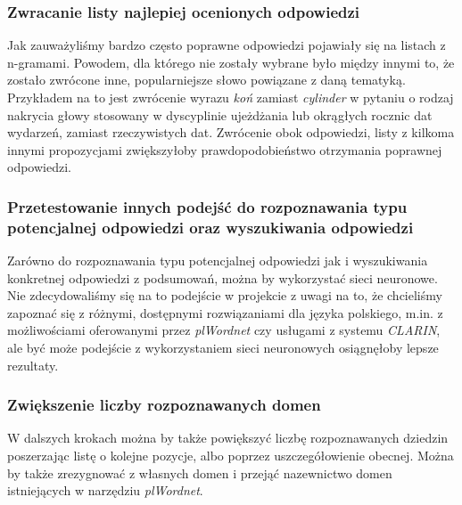 \subsubsection{Zwracanie listy najlepiej ocenionych odpowiedzi}
Jak zauważyliśmy bardzo często poprawne odpowiedzi pojawiały się na listach z n-gramami. Powodem, dla którego nie zostały wybrane było między innymi to, że zostało zwrócone inne, popularniejsze słowo powiązane z daną tematyką. Przykładem na to jest zwrócenie wyrazu \emph{koń} zamiast \emph{cylinder} w pytaniu o rodzaj nakrycia głowy stosowany w dyscyplinie ujeżdżania lub okrągłych rocznic dat wydarzeń, zamiast rzeczywistych dat. Zwrócenie obok odpowiedzi, listy z kilkoma innymi propozycjami zwiększyłoby prawdopodobieństwo otrzymania poprawnej odpowiedzi.

\subsubsection{Przetestowanie innych podejść do rozpoznawania typu potencjalnej odpowiedzi oraz wyszukiwania odpowiedzi}
Zarówno do rozpoznawania typu potencjalnej odpowiedzi jak i wyszukiwania konkretnej odpowiedzi z podsumowań, można by wykorzystać sieci neuronowe. Nie zdecydowaliśmy się na to podejście w projekcie z uwagi na to, że chcieliśmy zapoznać się z różnymi, dostępnymi rozwiązaniami dla języka polskiego, m.in. z możliwościami oferowanymi przez \emph{plWordnet} czy usługami z systemu \emph{CLARIN}, ale być może podejście z wykorzystaniem sieci neuronowych osiągnęłoby lepsze rezultaty.

\subsubsection{Zwiększenie liczby rozpoznawanych domen}
W dalszych krokach można by także powiększyć liczbę rozpoznawanych dziedzin poszerzając listę o kolejne pozycje, albo poprzez uszczegółowienie obecnej. Można by także zrezygnować z własnych domen i przejąć nazewnictwo domen istniejących w narzędziu \emph{plWordnet}. 

